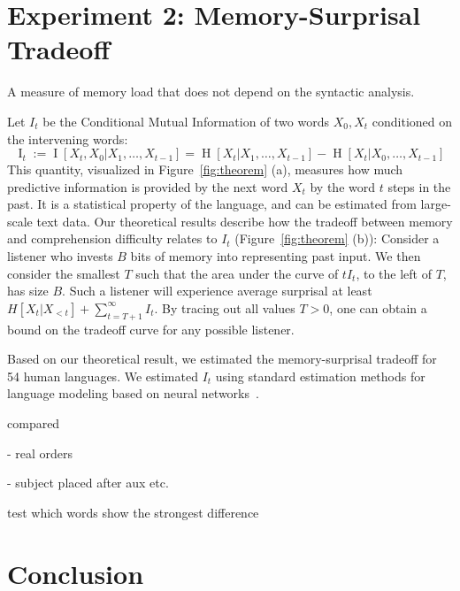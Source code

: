 \documentclass[11pt,a4paper]{article}
\newcounter{theorem}
\begin{document}
\section{Experiment 2: Memory-Surprisal Tradeoff}

A measure of memory load that does not depend on the syntactic analysis.

\cite{hahn2019memory}


Let $I_t$ be the Conditional Mutual Information of two words $X_0, X_t$ conditioned on the intervening words:
\begin{equation}
        \operatorname{I}_t := \operatorname{I}[X_t, X_0 | X_1, \dots, X_{t-1}] = \operatorname{H}[X_t|X_1, \dots, X_{t-1}] - \operatorname{H}[X_t|X_0, \dots, X_{t-1}] 
\end{equation}
This quantity, visualized in Figure~\ref{fig:theorem} (a), measures how much predictive information is provided by the next word $X_t$ by the word $t$ steps in the past.
It is a statistical property of the language, and can be estimated from large-scale text data.
Our theoretical results describe how the tradeoff between memory and comprehension difficulty relates to $I_t$ (Figure~\ref{fig:theorem} (b)):
Consider a listener who invests $B$ bits of memory into representing past input.
We then consider the smallest $T$ such that the area under the curve of $t I_t$, to the left of $T$, has size $B$.
Such a listener will experience average surprisal at least $H[X_t| X_{<t}] + \sum_{t=T+1}^\infty I_t$. %
By tracing out all values $T >0$, one can obtain a bound on the tradeoff curve for any possible listener.






Based on our theoretical result, we estimated the memory-surprisal tradeoff for 54 human languages.
We estimated $I_t$ using standard estimation methods for language modeling based on neural networks~\cite{hochreiter-long-1997}.


compared

- real orders

- subject placed after aux etc.


test which words show the strongest difference


\section{Conclusion}



%
\end{document}
